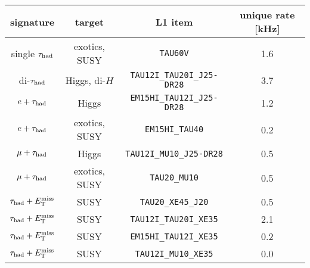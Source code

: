 \begin{tabular}{c|c|c|c}
  signature      & target        & L1 item                           & unique rate [kHz] \\
  \hline\hline
  single $\tau_\text{had}$ & exotics, SUSY & \texttt{TAU60V}                   & 1.6 \\
  di-$\tau_\text{had}$     & Higgs, di-$H$ & \texttt{TAU12I\_TAU20I\_J25-DR28} & 3.7 \\
  \hline
  $e   + \tau_\text{had}$  & Higgs         & \texttt{EM15HI\_TAU12I\_J25-DR28} & 1.2 \\
  $e   + \tau_\text{had}$  & exotics, SUSY & \texttt{EM15HI\_TAU40}            & 0.2 \\
  $\mu + \tau_\text{had}$  & Higgs         & \texttt{TAU12I\_MU10\_J25-DR28}   & 0.5 \\
  $\mu + \tau_\text{had}$  & exotics, SUSY & \texttt{TAU20\_MU10}              & 0.5 \\
  \hline
  $\tau_\text{had} + E_{\mathrm{T}}^{\mathrm{miss}}$ & SUSY          & \texttt{TAU20\_XE45\_J20}         & 0.5 \\
  $\tau_\text{had} + E_{\mathrm{T}}^{\mathrm{miss}}$ & SUSY          & \texttt{TAU12I\_TAU20I\_XE35}     & 2.1 \\
  $\tau_\text{had} + E_{\mathrm{T}}^{\mathrm{miss}}$ & SUSY          & \texttt{EM15HI\_TAU12I\_XE35}     & 0.2 \\
  $\tau_\text{had} + E_{\mathrm{T}}^{\mathrm{miss}}$ & SUSY          & \texttt{TAU12I\_MU10\_XE35}       & 0.0 \\
  \hline\hline
\end{tabular}

